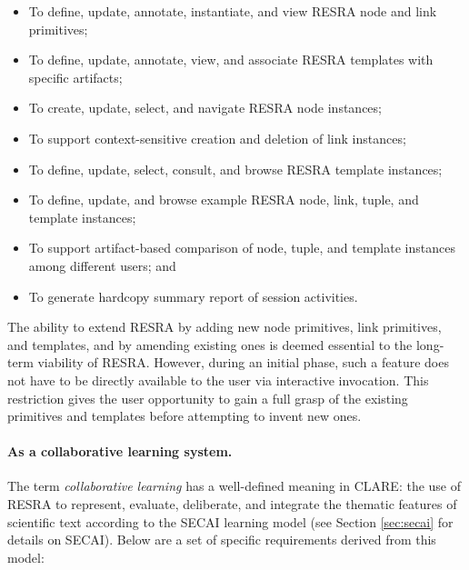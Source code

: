 \begin{itemize}
\item To define, update, annotate, instantiate, and view RESRA node and
  link primitives;
  
\item To define, update, annotate, view, and associate RESRA templates with
  specific artifacts;
  
\item To create, update, select, and navigate RESRA node instances;
  
\item To support context-sensitive creation and deletion of link instances;
  
\item To define, update, select, consult, and browse RESRA template
  instances;
  
\item To define, update, and browse example RESRA node, link, tuple, and
  template instances;
  
\item To support artifact-based comparison of node, tuple, and template
  instances among different users; and
  
\item To generate hardcopy summary report of session activities.
\end{itemize}

The ability to extend RESRA by adding new node primitives, link primitives,
and templates, and by amending existing ones is deemed essential to the
long-term viability of RESRA. However, during an initial phase, such a
feature does not have to be directly available to the user via interactive
invocation. This restriction gives the user opportunity to gain a full
grasp of the existing primitives and templates before attempting to invent
new ones.


\paragraph{As a collaborative learning system.}

The term {\it collaborative learning \/} has a well-defined meaning in
CLARE: the use of RESRA to represent, evaluate, deliberate, and integrate
the thematic features of scientific text according to the SECAI learning
model (see Section \ref{sec:secai} for details on SECAI). Below are a set
of specific requirements derived from this model:

